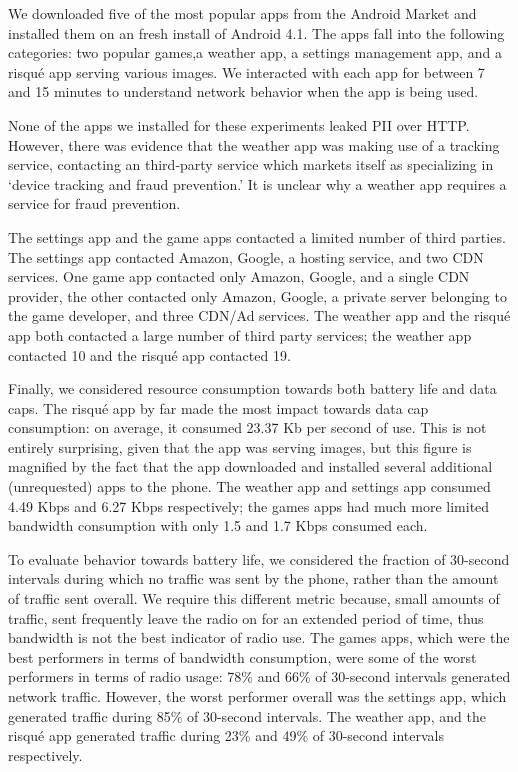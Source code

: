        We downloaded five of the most popular apps from the Android Market and installed them on an fresh install of Android 4.1.
       The apps fall into the following categories: two popular games,a weather app, a settings 
        management app, and a risqu\'{e} app serving various images. We interacted with each app for between 7 and 15 minutes 
        to understand network behavior when the app is being used.

    None of the apps we installed for these experiments leaked PII over HTTP. However, there was evidence that the weather app was making use of a tracking service, contacting an third-party service which markets itself as specializing in `device tracking and fraud prevention.'
    It is unclear why a weather app requires a service for fraud prevention.

    The settings app and the game apps contacted a limited number of third parties.
    The settings app contacted Amazon, Google, a hosting service, and two CDN services.
    One game app contacted only Amazon, Google, and a single CDN provider, the other contacted only Amazon, Google, a private server belonging to the game developer, and three CDN/Ad services.
    The weather app and the risqu\'{e} app both contacted a large number of third party services; the weather app contacted 10 and the risqu\'{e} app contacted 19. 

   Finally, we considered resource consumption towards both battery life and data caps.
    The risqu\'{e} app by far made the most impact towards data cap consumption: on average, it consumed 23.37 Kb per second of use.
    This is not entirely surprising, given that the app was serving images, but this figure is magnified by the fact that the app downloaded and installed several additional (unrequested) apps to the phone.
    The weather app and settings app consumed 4.49 Kbps and 6.27 Kbps respectively; the games apps had much more limited bandwidth consumption with only 1.5 and 1.7 Kbps consumed each.

    To evaluate behavior towards battery life, we considered the fraction of 30-second intervals during which no traffic was sent by the phone, rather than the amount of traffic sent overall. 
    We require this different metric because, \eg{} small amounts of traffic, sent frequently leave the radio on for an extended period of time, thus bandwidth is not the best indicator of radio use.
    The games apps, which were the best performers in terms of bandwidth consumption, were some of the worst performers in terms of radio usage: 78\% and 66\% of 30-second intervals generated network traffic.
    However, the worst performer overall was the settings app, which generated traffic during 85\% of 30-second intervals.
    The weather app, and the risqu\'{e} app generated traffic during 23\% and 49\% of 30-second intervals respectively.

